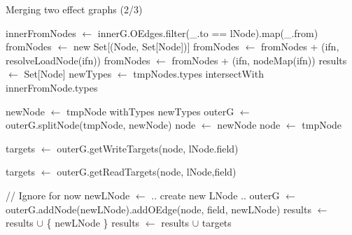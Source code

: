 \documentclass[a4paper]{article}
\begin{document}
\begin{algorithm}
    \ContinuedFloat
\caption{Merging two effect graphs (2/3)}\label{algo:pt:mergegraphs}
\begin{algorithmic}[1]
        \State innerFromNodes $\gets$ innerG.OEdges.filter(\_.to == lNode).map(\_.from)
        \State fromNodes $\gets$ new Set[(Node, Set[Node])]
                \State fromNodes $\gets$ fromNodes + (ifn, resolveLoadNode(ifn))
            \Else
                \State fromNodes $\gets$ fromNodes + (ifn, nodeMap(ifn))
            \EndIf
        \EndFor
        \State
        \State results $\gets$ Set[Node]
        \State
            \State newTypes $\gets$ tmpNodes.types intersectWith innerFromNode.types

                    \State newNode $\gets$ tmpNode withTypes newTypes
                    \State outerG  $\gets$ outerG.splitNode(tmpNode, newNode)
                    \State node $\gets$ newNode
                \Else
                    \State node $\gets$ tmpNode
                \EndIf

                \State targets $\gets$ outerG.getWriteTargets(node, lNode.field)

                    \State targets $\gets$ outerG.getReadTargets(node, lNode,field)
                \EndIf

                        \State // Ignore for now
                    \Else
                        \State newLNode $\gets$ .. create new LNode ..
                        \State outerG $\gets$ outerG.addNode(newLNode).addOEdge(node, field, newLNode)
                        \State results $\gets$ results $\cup$ \{ newLNode \}
                    \EndIf
                \Else
                    \State results $\gets$ results $\cup$ targets
                \EndIf
            \EndIf
        \EndFor
    \EndFunction
\end{algorithmic}
\end{algorithm}
\end{document}
